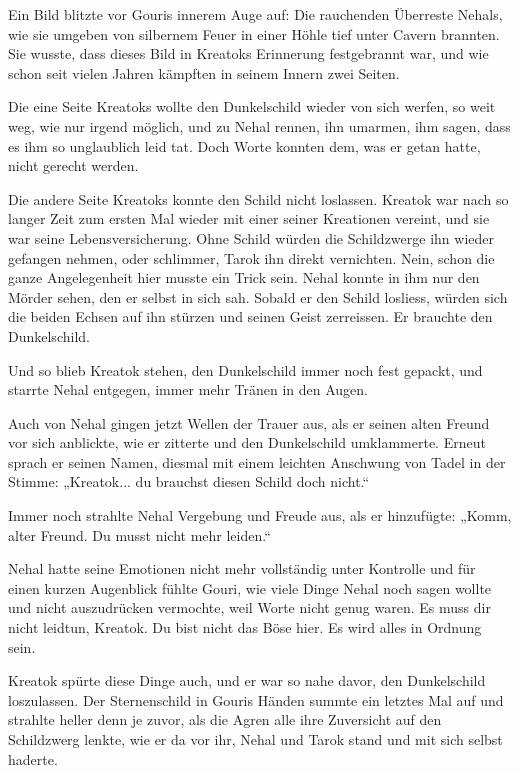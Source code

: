 \documentclass[10pt, a4paper, oneside]{book}
\begin{document}
Ein Bild blitzte vor Gouris innerem Auge auf: Die rauchenden Überreste Nehals, wie sie umgeben von silbernem Feuer in einer Höhle tief unter Cavern brannten. Sie wusste, dass dieses Bild in Kreatoks Erinnerung festgebrannt war, und wie schon seit vielen Jahren kämpften in seinem Innern zwei Seiten.

Die eine Seite Kreatoks wollte den Dunkelschild wieder von sich werfen, so weit weg, wie nur irgend möglich, und zu Nehal rennen, ihn umarmen, ihm sagen, dass es ihm so unglaublich leid tat. Doch Worte konnten dem, was er getan hatte, nicht gerecht werden.

Die andere Seite Kreatoks konnte den Schild nicht loslassen. Kreatok war nach so langer Zeit zum ersten Mal wieder mit einer seiner Kreationen vereint, und sie war seine Lebensversicherung. Ohne Schild würden die Schildzwerge ihn wieder gefangen nehmen, oder schlimmer, Tarok ihn direkt vernichten. Nein, schon die ganze Angelegenheit hier musste ein Trick sein. Nehal konnte in ihm nur den Mörder sehen, den er selbst in sich sah. Sobald er den Schild losliess, würden sich die beiden Echsen auf ihn stürzen und seinen Geist zerreissen. Er brauchte den Dunkelschild.

Und so blieb Kreatok stehen, den Dunkelschild immer noch fest gepackt, und starrte Nehal entgegen, immer mehr Tränen in den Augen.

Auch von Nehal gingen jetzt Wellen der Trauer aus, als er seinen alten Freund vor sich anblickte, wie er zitterte und den Dunkelschild umklammerte. Erneut sprach er seinen Namen, diesmal mit einem leichten Anschwung von Tadel in der Stimme: „Kreatok... du brauchst diesen Schild doch nicht.“

Immer noch strahlte Nehal Vergebung und Freude aus, als er hinzufügte: „Komm, alter Freund. Du musst nicht mehr leiden.“

Nehal hatte seine Emotionen nicht mehr vollständig unter Kontrolle und für einen kurzen Augenblick fühlte Gouri, wie viele Dinge Nehal noch sagen wollte und nicht auszudrücken vermochte, weil Worte nicht genug waren. Es muss dir nicht leidtun, Kreatok. Du bist nicht das Böse hier. Es wird alles in Ordnung sein.

Kreatok spürte diese Dinge auch, und er war so nahe davor, den Dunkelschild loszulassen. Der Sternenschild in Gouris Händen summte ein letztes Mal auf und strahlte heller denn je zuvor, als die Agren alle ihre Zuversicht auf den Schildzwerg lenkte, wie er da vor ihr, Nehal und Tarok stand und mit sich selbst haderte.
\end{document}
